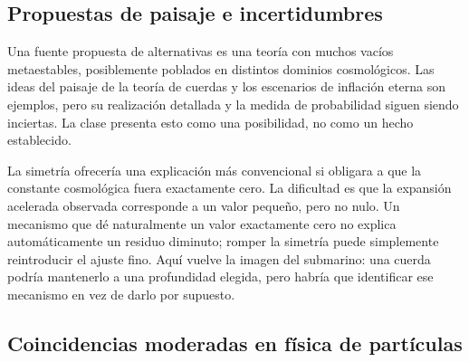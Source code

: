 \subsection{Propuestas de paisaje e incertidumbres}

Una fuente propuesta de alternativas es una teoría con muchos vacíos metaestables, posiblemente poblados en distintos dominios cosmológicos. Las ideas del paisaje de la teoría de cuerdas y los escenarios de inflación eterna son ejemplos, pero su realización detallada y la medida de probabilidad siguen siendo inciertas. La clase presenta esto como una posibilidad, no como un hecho establecido.

La simetría ofrecería una explicación más convencional si obligara a que la constante cosmológica fuera exactamente cero. La dificultad es que la expansión acelerada observada corresponde a un valor pequeño, pero no nulo. Un mecanismo que dé naturalmente un valor exactamente cero no explica automáticamente un residuo diminuto; romper la simetría puede simplemente reintroducir el ajuste fino. Aquí vuelve la imagen del submarino: una cuerda podría mantenerlo a una profundidad elegida, pero habría que identificar ese mecanismo en vez de darlo por supuesto.

\begin{classroomqa}
\end{classroomqa}

\begin{classroomqa}
\end{classroomqa}

\subsection{Coincidencias moderadas en física de partículas}

